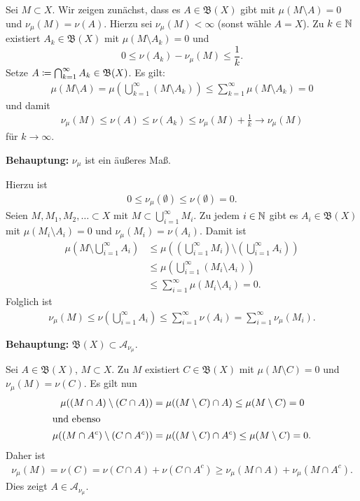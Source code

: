 \documentclass[a4paper,twoside,DIV15,BCOR12mm]{scrbook}
\newcommand{\A}{\mathcal A}
\newcommand{\borel}{\mathfrak B}
\begin{document}
\begin{beweis}
Sei $M\subset X$. Wir zeigen zunächst, dass es $A\in\borel(X)$ gibt mit $\mu(M\setminus A)=0$ und $\nu_\mu(M) = \nu(A)$. Hierzu sei $\nu_\mu(M)<\infty$ (sonst wähle $A=X$). Zu $k\in\mathbb{N}$ existiert $A_k\in\borel(X)$ mit $\mu(M\setminus A_k)=0$ und
\[
0 \le \nu(A_k) - \nu_\mu(M) \le \frac1k.
\]
Setze $A\da\bigcap_{k=1}^\infty A_k \in \borel(X)$. Es gilt:
\begin{align*}
\mu(M\setminus A) = \mu(\bigcup_{k=1}^\infty (M\setminus A_k)) \le \sum_{k=1}^\infty  \mu(M\setminus A_k) = 0
\end{align*}
und damit
\begin{align*}
\nu_\mu(M) \le \nu(A) \le \nu(A_k) \le \nu_\mu(M) + \frac1k \to \nu_\mu(M)
\end{align*}
für $k\to\infty$.

\textbf{Behauptung:} $\nu_\mu$ ist ein äußeres Maß.

Hierzu ist 
\begin{align*}
0 \le \nu_\mu(\emptyset) \le \nu(\emptyset) = 0.
\end{align*}
Seien $M,M_1,M_2,\ldots \subset X$ mit $M\subset \bigcup_{i=1}^\infty M_i$. Zu jedem $i\in\mathbb{N}$ gibt es $A_i \in\borel(X)$ mit $\mu(M_i\setminus A_i) = 0$ und $\nu_\mu(M_i) = \nu(A_i)$. Damit ist
\begin{align*}
\mu(M \setminus\bigcup_{i=1}^\infty A_i) 
&\le \mu( (\bigcup_{i=1}^\infty M_i) \setminus (\bigcup_{i=1}^\infty A_i))\\
&\le \mu( \bigcup_{i=1}^\infty (M_i \setminus A_i) )\\
&\le \sum_{i=1}^\infty \mu(M_i\setminus A_i) = 0.
\end{align*}
Folglich ist
\begin{align*}
\nu_\mu(M)
\le \nu(\bigcup_{i=1}^\infty A_i) 
\le \sum_{i=1}^\infty \nu(A_i) = \sum_{i=1}^\infty \nu_\mu(M_i).
\end{align*}

\textbf{Behauptung:} $\borel(X) \subset \A_{\nu_\mu}$.

Sei $A\in\borel(X)$, $M\subset X$. Zu $M$ existiert $C\in\borel(X)$ mit $\mu(M\setminus C) = 0$ und $\nu_\mu(M) = \nu(C)$. Es gilt nun
\begin{align*}
\mu( (M\cap A) \setminus (C\cap A) )
&= \mu( (M\setminus C) \cap A ) 
\le \mu(M\setminus C) = 0 \\
\intertext{und ebenso}
\mu( (M\cap A^c) \setminus (C\cap A^c) )
&= \mu( (M\setminus C) \cap A^c ) 
\le \mu(M\setminus C) = 0.
\end{align*}
Daher ist
\begin{align*}
\nu_\mu(M) = \nu(C) = \nu(C \cap A) + \nu(C\cap A^c) 
\ge \nu_\mu(M\cap A) + \nu_\mu(M \cap A^c).
\end{align*}
Dies zeigt $A\in \A_{\nu_\mu}$.


\end{beweis}
\end{document}
